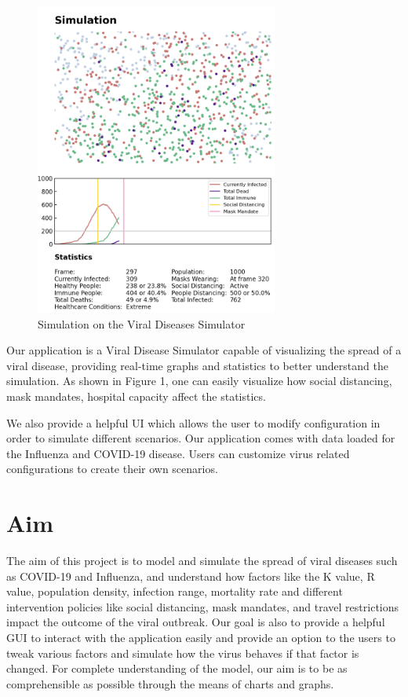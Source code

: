 \documentclass[11pt]{article}
\begin{document}
\begin{figure}[H]
\caption{Simulation on the Viral Diseases Simulator}\label{wrap-fig:1}
\includegraphics[width=8cm]{figures/intro-simulation.png}
\end{figure} 

Our application is a Viral Disease Simulator capable of visualizing  the spread of a viral disease, providing real-time graphs and statistics to better understand the simulation. As shown in Figure 1, one can easily visualize how social distancing, mask mandates, hospital capacity affect the statistics. 


We also provide a helpful UI which allows the user to modify configuration in order to simulate different scenarios. Our application comes with data loaded for the Influenza and COVID-19 disease. Users can customize virus related configurations to create their own scenarios.

\section{Aim}
The aim of this project is to model and simulate the spread of viral diseases such as COVID-19 and Influenza, and understand how factors like the K value, R value, population density, infection range, mortality rate and different intervention policies like social distancing, mask mandates, and travel restrictions impact the outcome of the viral outbreak. Our goal is also to provide a helpful GUI to interact with the application easily and provide an option to the users to tweak various factors and simulate how the virus behaves if that factor is changed. For complete understanding of the model, our aim is to be as comprehensible as possible through the means of charts and graphs.
\end{document}
